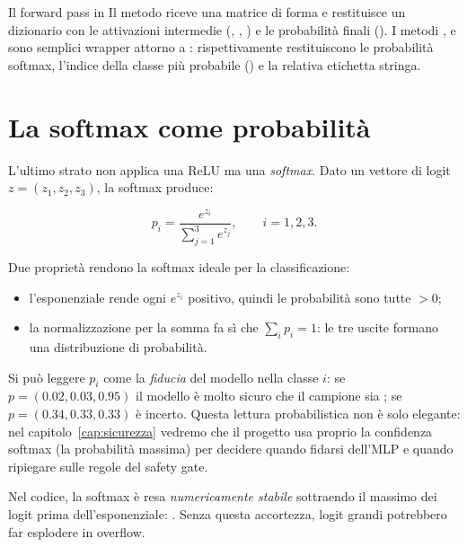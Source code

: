 \begin{esempio}{Il forward pass in \progetto{}}
Il metodo  riceve una matrice  di forma
 e restituisce un dizionario con le attivazioni
intermedie (, , ) e le probabilità finali
(). I metodi ,  e
 sono semplici wrapper attorno a :
rispettivamente restituiscono le probabilità softmax, l'indice della classe
più probabile () e la relativa etichetta stringa.
\end{esempio}

\section{La softmax come probabilità}\label{sec:softmax}

L'ultimo strato non applica una ReLU ma una \emph{softmax}. Dato un vettore
di logit $z = (z_1, z_2, z_3)$, la softmax produce:

\begin{equation}
p_i = \frac{e^{z_i}}{\sum_{j=1}^{3} e^{z_j}}, \qquad i = 1, 2, 3.
\end{equation}

Due proprietà rendono la softmax ideale per la classificazione:

\begin{itemize}
  \item l'esponenziale rende ogni $e^{z_i}$ positivo, quindi le probabilità
        sono tutte $> 0$;
  \item la normalizzazione per la somma fa sì che $\sum_i p_i = 1$: le tre
        uscite formano una distribuzione di probabilità.
\end{itemize}

Si può leggere $p_i$ come la \emph{fiducia} del modello nella classe $i$:
se $p = (0.02, 0.03, 0.95)$ il modello è molto sicuro che il campione sia
; se $p = (0.34, 0.33, 0.33)$ è incerto. Questa lettura
probabilistica non è solo elegante: nel capitolo~\ref{cap:sicurezza}
vedremo che il progetto usa proprio la confidenza softmax (la probabilità
massima) per decidere quando fidarsi dell'MLP e quando ripiegare sulle
regole del safety gate.

Nel codice, la softmax è resa \emph{numericamente stabile} sottraendo il
massimo dei logit prima dell'esponenziale:
. Senza
questa accortezza, logit grandi potrebbero far esplodere  in
overflow.

